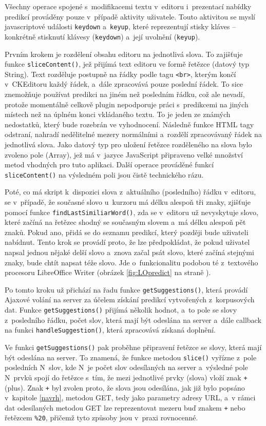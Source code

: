 \documentclass[a4paper,11pt,openany]{book} %
\begin{document}
Všechny operace spojené s~modifikacemi textu v~editoru i~prezentací nabídky predikcí prováděny pouze v~případě aktivity uživatele. Touto aktivitou se myslí javascriptové události {\tt keydown} a~{\tt keyup}, které reprezentují stisky kláves -- konkrétně stisknutí klávesy ({\tt keydown}) a~její uvolnění ({\tt keyup}).

Prvním krokem je rozdělení obsahu editoru na jednotlivá slova. To zajišťuje funkce {\tt sliceContent()}, jež přijímá text editoru ve formě řetězce (datový typ String). Text rozděluje postupně na řádky podle tagu {\tt <br>}, kterým končí v~CKEditoru každý řádek, a~dále zpracovává pouze poslední řádek. To sice znemožňuje používat predikci na jiném než posledním řádku, což ale nevadí, protože momentálně celkově plugin nepodporuje práci s~predikcemi na jiných místech než na úplném konci vkládaného textu. To je jeden ze známých nedostatků, který bude rozebrán ve vyhodnocení. Následně funkce HTML tagy odstraní, nahradí nedělitelné mezery normálními a~rozdělí zpracovávaný řádek na jednotlivá slova. Jako datový typ pro uložení řetězce rozděleného na slova bylo zvoleno pole (Array), jež má v~jazyce JavaScript připraveno velké množství metod vhodných pro tuto aplikaci. Další operace prováděné funkcí {\tt sliceContent()} na výsledném poli jsou čistě technického rázu. 

Poté, co má skript k~dispozici slova z~aktuálního (posledního) řádku v~editoru, se v~případě, že současné slovo u~kurzoru má délku alespoň tři znaky, zjišťuje pomocí funkce {\tt findLastSimiliarWord()}, zda se v~editoru už nevyskytuje slovo, které začíná na řetězec shodný se současným slovem a~má délku alespoň pět znaků. Pokud ano, přidá se do seznamu predikcí, který později bude uživateli nabídnut. Tento krok se provádí proto, že lze předpokládat, že pokud uživatel napsal jednou nějaké delší slovo a~znova začal psát slovo, které začíná stejnými znaky, bude chtít napsat téže slovo. Jde o~funkcionalitu podobou té z~textového procesoru LibreOffice Writer (obrázek \ref{fig:LOpredict} na straně \pageref{fig:LOpredict}).

Po tomto kroku už přichází na řadu funkce {\tt getSuggestions()}, která provádí Ajaxové volání na server za účelem získání predikcí vytvořených z~korpusových dat. Funkce {\tt getSuggestions()} přijímá několik hodnot, a~to pole se slovy z~posledního řádku, počet slov, která mají být odeslána na server a~dále callback na funkci {\tt handleSuggestion()}, která zpracovává získaná doplnění.

Ve funkci {\tt getSuggestions()} pak proběhne připravení řetězce se slovy, která mají být odeslána na server. To znamená, že funkce metodou {\tt slice()} vyřízne z~pole posledních N~slov, kde N~je počet slov odesílaných na server a~výsledné pole N~prvků spojí do řetězce s~tím, že mezi jednotlivé prvky (slova) vloží znak {\tt +} (plus). Znak {\tt +} byl zvolen proto, že slova jsou odesílána, jak již bylo popsáno v~kapitole \ref{navrh}, metodou GET, tedy jako parametry adresy URL, a~v rámci dat odesílaných metodou GET lze reprezentovat mezeru buď znakem {\tt +} nebo řetězcem {\tt \%20}, přičemž tyto způsoby jsou v~praxi rovnocenné.
\end{document}

